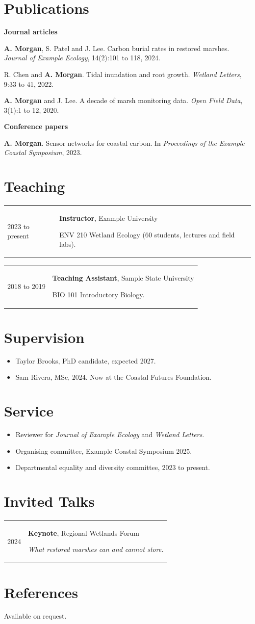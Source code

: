 \documentclass[11pt]{article}
\makeatletter
\newcommand{\entry}[4]{%
  \begin{tabularx}{\textwidth}{@{}p{2.6cm}X@{}}
    \small #1 & \textbf{#2}, #3\par\small #4
  \end{tabularx}\par\smallskip}
\makeatother
\begin{document}
\section{Publications}
\textbf{Journal articles}
\begin{pubs}[label={[J\arabic*]}]
  \item \textbf{A. Morgan}, S. Patel and J. Lee. Carbon burial rates in restored marshes. \emph{Journal of Example Ecology}, 14(2):101 to 118, 2024.
  \item R. Chen and \textbf{A. Morgan}. Tidal inundation and root growth. \emph{Wetland Letters}, 9:33 to 41, 2022.
  \item \textbf{A. Morgan} and J. Lee. A decade of marsh monitoring data. \emph{Open Field Data}, 3(1):1 to 12, 2020.
\end{pubs}
\textbf{Conference papers}
\begin{pubs}[label={[C\arabic*]}]
  \item \textbf{A. Morgan}. Sensor networks for coastal carbon. In \emph{Proceedings of the Example Coastal Symposium}, 2023.
\end{pubs}

\section{Teaching}
\entry{2023 to present}{Instructor}{Example University}{ENV 210 Wetland Ecology (60 students, lectures and field labs).}
\entry{2018 to 2019}{Teaching Assistant}{Sample State University}{BIO 101 Introductory Biology.}

\section{Supervision}
\begin{itemize}[leftmargin=*,itemsep=0pt]
  \item Taylor Brooks, PhD candidate, expected 2027.
  \item Sam Rivera, MSc, 2024. Now at the Coastal Futures Foundation.
\end{itemize}

\section{Service}
\begin{itemize}[leftmargin=*,itemsep=0pt]
  \item Reviewer for \emph{Journal of Example Ecology} and \emph{Wetland Letters}.
  \item Organising committee, Example Coastal Symposium 2025.
  \item Departmental equality and diversity committee, 2023 to present.
\end{itemize}

\section{Invited Talks}
\entry{2024}{Keynote}{Regional Wetlands Forum}{\emph{What restored marshes can and cannot store.}}

\section{References}
Available on request.
\end{document}

